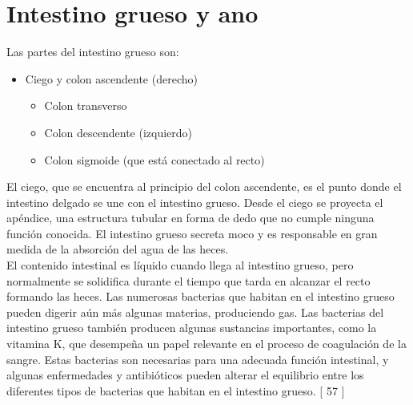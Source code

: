 \section{Intestino grueso y ano}
Las partes del intestino grueso son:\\
\begin{itemize}
    \item Ciego y colon ascendente (derecho)
    \begin{itemize}
        \item Colon transverso
        \item Colon descendente (izquierdo)
        \item Colon sigmoide (que está conectado al recto)
    \end{itemize}
\end{itemize}
El ciego, que se encuentra al principio del colon ascendente, es el punto donde el intestino delgado se une con el intestino grueso. Desde el ciego se proyecta el apéndice, 
una estructura tubular en forma de dedo que no cumple ninguna función conocida. El intestino grueso secreta moco y es responsable en gran medida de la absorción del agua de las heces.\\
El contenido intestinal es líquido cuando llega al intestino grueso, pero normalmente se solidifica durante el tiempo que tarda en alcanzar el recto formando las heces. 
Las numerosas bacterias que habitan en el intestino grueso pueden digerir aún más algunas materias, produciendo gas. Las bacterias del intestino grueso también producen 
algunas sustancias importantes, como la vitamina K, que desempeña un papel relevante en el proceso de coagulación de la sangre. Estas bacterias son necesarias para una 
adecuada función intestinal, y algunas enfermedades y antibióticos pueden alterar el equilibrio entre los diferentes tipos de bacterias que habitan en el intestino grueso. [ 57 ]\\
